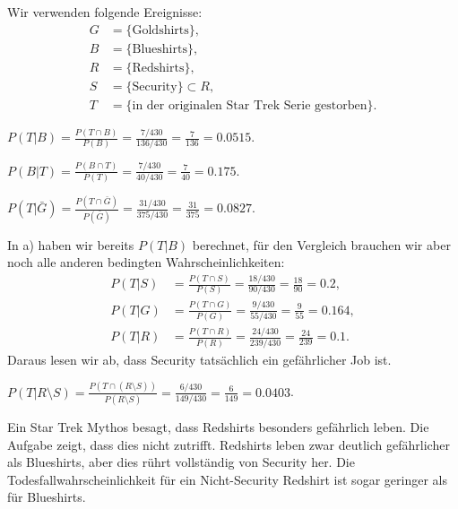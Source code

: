 \begin{loesung}
Wir verwenden folgende Ereignisse:
\begin{align*}
G&=\{\text{Goldshirts}\},\\
B&=\{\text{Blueshirts}\},\\
R&=\{\text{Redshirts}\},\\
S&=\{\text{Security}\}\subset R,\\
T&=\{\text{in der originalen Star Trek Serie gestorben}\}.
\end{align*}
\begin{teilaufgaben}
\item
$
\displaystyle
P(T|B)
=
\frac{P(T\cap B)}{P(B)}
=
\frac{7/430}{136/430}
=
\frac{7}{136}
=0.0515.
$
\item
$
\displaystyle
P(B|T)
=
\frac{P(B\cap T)}{P(T)}
=
\frac{7/430}{40/430}
=
\frac{7}{40}
=0.175.
$
\item
$
\displaystyle
P(T|\bar G)
=
\frac{P(T\cap\bar G)}{P(\bar G)}
=
\frac{31/430}{375/430}
=
\frac{31}{375}
=0.0827.
$
\item
In a) haben wir bereits $P(T|B)$ berechnet, für den Vergleich
brauchen wir aber noch alle anderen bedingten Wahrscheinlichkeiten:
\begin{align*}
P(T|S)&
=\frac{P(T\cap S)}{P(S)}
=\frac{18/430}{90/430}
=\frac{18}{90}
=0.2,
\\
P(T|G)&
=\frac{P(T\cap G)}{P(G)}
=\frac{9/430}{55/430}
=\frac{9}{55}
=0.164,
\\
P(T|R)&
=\frac{P(T\cap R)}{P(R)}
=\frac{24/430}{239/430}
=\frac{24}{239}
=0.1.
\end{align*}
Daraus lesen wir ab, dass Security tatsächlich ein gefährlicher
Job ist.
\item
$
\displaystyle
P(T|R\setminus S)
=\frac{P(T\cap(R\setminus S))}{P(R\setminus S)}
=\frac{6/430}{149/430}
=\frac{6}{149}
=0.0403$.
\qedhere
\end{teilaufgaben}
\end{loesung}

\begin{diskussion}
Ein Star Trek Mythos besagt, dass Redshirts besonders gefährlich
leben. Die Aufgabe zeigt, dass dies nicht zutrifft.
Redshirts leben zwar deutlich gefährlicher als Blueshirts, aber
dies rührt vollständig von Security her. Die Todesfallwahrscheinlichkeit
für ein Nicht-Security Redshirt ist sogar geringer als für Blueshirts.
\end{diskussion}


